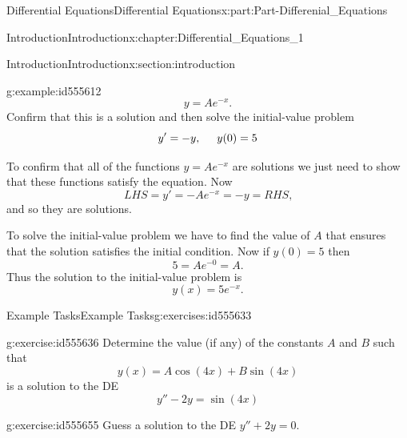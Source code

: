 \documentclass[oneside,10pt,]{book}
\numberwithin{equation}{section}
\begin{document}
\begin{partptx}{Differential Equations}{}{Differential Equations}{}{}{x:part:Part-Differenial_Equations}
\begin{chapterptx}{Introduction}{}{Introduction}{}{}{x:chapter:Differential_Equations_1}
\begin{sectionptx}{Introduction}{}{Introduction}{}{}{x:section:introduction}
\begin{example}{}{g:example:id555612}
\begin{equation*}
y=Ae^{-x}\text{.}
\end{equation*}
Confirm that this is a solution and then solve the initial-value problem%
\begin{equation*}
y'=-y, \hspace{5mm} y(0)=5
\end{equation*}
%
\par\smallskip%
\noindent\hypertarget{g:solution:id555625}{}To confirm that all of the functions \(y=Ae^{-x}\) are solutions we just need to show that these functions satisfy the equation. Now%
\begin{equation*}
LHS=y'=-Ae^{-x}=-y=RHS\text{,}
\end{equation*}
and so they are solutions.%
\par
To solve the initial-value problem we have to find the value of \(A\) that ensures that the solution satisfies the initial condition. Now if \(y(0)=5\) then%
\begin{equation*}
5=Ae^{-0}=A\text{.}
\end{equation*}
Thus the solution to the initial-value problem is%
\begin{equation*}
y(x)=5e^{-x}\text{.}
\end{equation*}
%
\end{example}
%
%
\typeout{************************************************}
\typeout{************************************************}
%
\begin{exercises-subsection-numberless}{Example Tasks}{}{Example Tasks}{}{}{g:exercises:id555633}
\begin{divisionexercise}{1}{}{}{g:exercise:id555636}%
Determine the value (if any) of the constants \(A\) and \(B\) such that%
%
\begin{equation*}
y(x)=A\cos(4x)+B\sin(4x)
\end{equation*}
is a solution to the DE%
\begin{equation*}
y''-2y=\sin(4x)
\end{equation*}
\end{divisionexercise}%
\begin{divisionexercise}{2}{}{}{g:exercise:id555655}%
Guess a solution to the DE \(y''+2y=0\).%
\end{divisionexercise}%
\end{exercises-subsection-numberless}
\end{sectionptx}
%
%
\typeout{************************************************}

\end{chapterptx}
\end{partptx}
\end{document}
